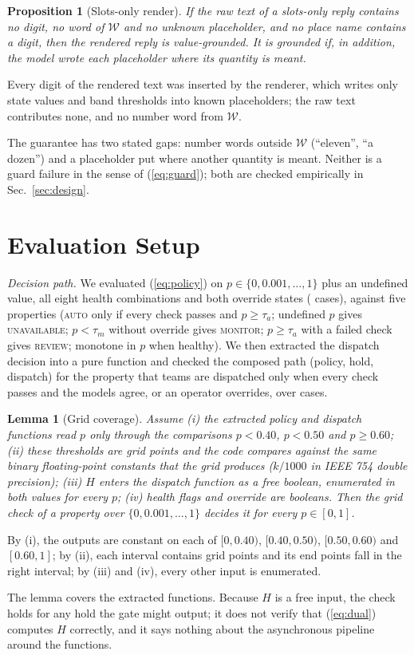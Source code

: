 \documentclass[conference]{IEEEtran}
\newtheorem{proposition}{Proposition}
\newtheorem{lemma}{Lemma}
\begin{document}
\begin{proposition}[Slots-only render]
If the raw text of a slots-only reply contains no digit, no word of $\mathcal{W}$ and no unknown placeholder, and no place name contains a digit, then the rendered reply is value-grounded. It is grounded if, in addition, the model wrote each placeholder where its quantity is meant.
\end{proposition}
\begin{IEEEproof}
Every digit of the rendered text was inserted by the renderer, which writes only state values and band thresholds into known placeholders; the raw text contributes none, and no number word from $\mathcal{W}$.
\end{IEEEproof}
The guarantee has two stated gaps: number words outside $\mathcal{W}$ (``eleven'', ``a dozen'') and a placeholder put where another quantity is meant. Neither is a guard failure in the sense of (\ref{eq:guard}); both are checked empirically in Sec.~\ref{sec:design}.

\section{Evaluation Setup}
\textit{Decision path.} We evaluated (\ref{eq:policy}) on $p\in\{0,0.001,\dots,1\}$ plus an undefined value, all eight health combinations and both override states (\PolCases{} cases), against five properties (\textsc{auto} only if every check passes and $p\ge\tau_a$; undefined $p$ gives \textsc{unavailable}; $p<\tau_m$ without override gives \textsc{monitor}; $p\ge\tau_a$ with a failed check gives \textsc{review}; monotone in $p$ when healthy). We then extracted the dispatch decision into a pure function and checked the composed path (policy, hold, dispatch) for the property that teams are dispatched only when every check passes and the models agree, or an operator overrides, over \EtoECases{} cases.

\begin{lemma}[Grid coverage]
Assume (i) the extracted policy and dispatch functions read $p$ only through the comparisons $p<0.40$, $p<0.50$ and $p\ge0.60$; (ii) these thresholds are grid points and the code compares against the same binary floating-point constants that the grid produces ($k/1000$ in IEEE 754 double precision); (iii) $H$ enters the dispatch function as a free boolean, enumerated in both values for every $p$; (iv) health flags and override are booleans. Then the grid check of a property over $\{0,0.001,\dots,1\}$ decides it for every $p\in[0,1]$.
\end{lemma}
\begin{IEEEproof}
By (i), the outputs are constant on each of $[0,0.40)$, $[0.40,0.50)$, $[0.50,0.60)$ and $[0.60,1]$; by (ii), each interval contains grid points and its end points fall in the right interval; by (iii) and (iv), every other input is enumerated.
\end{IEEEproof}
The lemma covers the extracted functions. Because $H$ is a free input, the check holds for any hold the gate might output; it does not verify that (\ref{eq:dual}) computes $H$ correctly, and it says nothing about the asynchronous pipeline around the functions.
\end{document}
